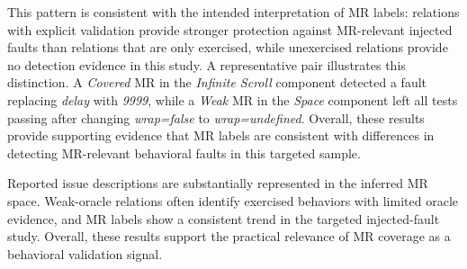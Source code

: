 This pattern is consistent with the intended interpretation of MR labels: relations with explicit validation provide stronger protection against MR-relevant injected faults than relations that are only exercised, while unexercised relations provide no detection evidence in this study. A representative pair illustrates this distinction. A \textit{Covered} MR in the \textit{Infinite Scroll} component detected a fault replacing \textit{delay} with \textit{9999}, while a \textit{Weak} MR in the \textit{Space} component left all tests passing after changing \textit{wrap=false} to \textit{wrap=undefined}. Overall, these results provide supporting evidence that MR labels are consistent with differences in detecting MR-relevant behavioral faults in this targeted sample.


\begin{tcolorbox}[colback=gray!5, colframe=gray!30, title=\textbf{\small Answer to RQ4}, coltitle=black!90, left=2.5pt, top=3pt, bottom=3pt, right=2.5pt, boxsep=1.8pt]
Reported issue descriptions are substantially represented in the inferred MR space. Weak-oracle relations often identify exercised behaviors with limited oracle evidence, and MR labels show a consistent trend in the targeted injected-fault study. Overall, these results support the practical relevance of MR coverage as a behavioral validation signal.
\end{tcolorbox}

